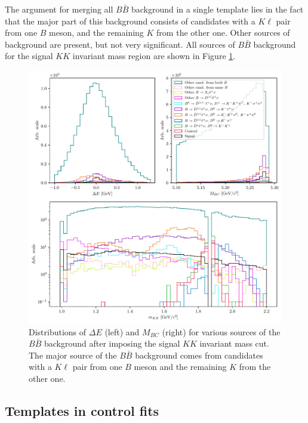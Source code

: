 The argument for merging all $B \bar B$ background in a single template lies in the fact that the major part of this background consists of candidates with a $K \ell$ pair from one $B$ meson, and the remaining $K$ from the other one. Other sources of background are present, but not very significant. All sources of $B \bar B$ background for the signal $KK$ invariant mass region are shown in Figure \ref{fig:sig_BKG_comp}.

\begin{figure}[H]
	\centering
	\captionsetup{width=0.8\linewidth}
	\includegraphics[width=\linewidth]{fig/sig_BKG_composition_all_before}
	\caption{Distributions of $\Delta E$ (left) and $M_{BC}$ (right) for various sources of the $B \bar B$ background after imposing the signal $KK$ invariant mass cut. The major source of the $B \bar B$ background comes from candidates with a $K\ell$ pair from one $B$ meson and the remaining $K$ from the other one.}
	\label{fig:sig_BKG_comp}
\end{figure}

\subsection{Templates in control fits}


